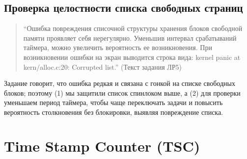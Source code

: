 \documentclass[a4paper,12pt]{article}
\begin{document}
\subsection{Проверка целостности списка свободных страниц}
\begin{quote}
``Ошибка повреждения списочной структуры хранения блоков свободной памяти проявляет себя нерегулярно. Уменьшив интервал срабатываний таймера, можно увеличить вероятность ее возникновения. При возникновении ошибки на экран выводится строка вида: kernel panic at kern/alloc.c:20: Corrupted list.'' (Текст задания ЛР5)
\end{quote}
Задание говорит, что ошибка редкая и связана с гонкой на списке свободных блоков; поэтому (1) мы защитили список спинлоком выше, а (2) для проверки уменьшаем период таймера, чтобы чаще переключать задачи и повысить вероятность столкновения без блокировки, выявляя повреждение списка.

\section{Time Stamp Counter (TSC)}
\end{document}
